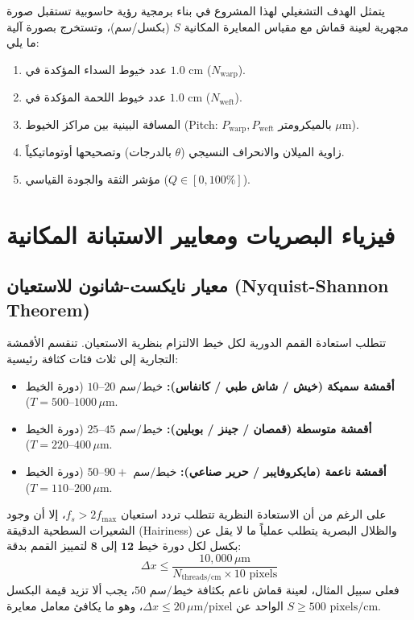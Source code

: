 \documentclass[11pt,a4paper]{article}
\begin{document}
يتمثل الهدف التشغيلي لهذا المشروع في بناء برمجية رؤية حاسوبية تستقبل صورة مجهرية لعينة قماش مع مقياس المعايرة المكانية $S$ (بكسل/سم)، وتستخرج بصورة آلية ما يلي:
\begin{enumerate}
    \item عدد خيوط السداء المؤكدة في $1.0\text{ cm}$ ($N_{\text{warp}}$).
    \item عدد خيوط اللحمة المؤكدة في $1.0\text{ cm}$ ($N_{\text{weft}}$).
    \item المسافة البينية بين مراكز الخيوط (Pitch: $P_{\text{warp}}, P_{\text{weft}}$ بالميكرومتر $\mu\text{m}$).
    \item زاوية الميلان والانحراف النسيجي ($\theta$ بالدرجات) وتصحيحها أوتوماتيكياً.
    \item مؤشر الثقة والجودة القياسي ($Q \in [0, 100\%]$).
\end{enumerate}

\section{فيزياء البصريات ومعايير الاستبانة المكانية}

\subsection{معيار نايكست-شانون للاستعيان (Nyquist-Shannon Theorem)}
تتطلب استعادة القمم الدورية لكل خيط الالتزام بنظرية الاستعيان. تنقسم الأقمشة التجارية إلى ثلاث فئات كثافة رئيسية:
\begin{itemize}
    \item \textbf{أقمشة سميكة (خيش / شاش طبي / كانفاس):} $10\text{--}20\text{ خيط/سم}$ (دورة الخيط $T = 500\text{--}1000\,\mu\text{m}$).
    \item \textbf{أقمشة متوسطة (قمصان / جينز / بوبلين):} $25\text{--}45\text{ خيط/سم}$ (دورة الخيط $T = 220\text{--}400\,\mu\text{m}$).
    \item \textbf{أقمشة ناعمة (مايكروفايبر / حرير صناعي):} $50\text{--}90+\text{ خيط/سم}$ (دورة الخيط $T = 110\text{--}200\,\mu\text{m}$).
\end{itemize}

على الرغم من أن الاستعادة النظرية تتطلب تردد استعيان $f_s > 2 f_{\max}$، إلا أن وجود الشعيرات السطحية الدقيقة (Hairiness) والظلال البصرية يتطلب عملياً ما لا يقل عن $\mathbf{8\text{ إلى }12\text{ بكسل لكل دورة خيط}}$ لتمييز القمم بدقة:
\begin{equation}
    \Delta x \le \frac{10,000\,\mu\text{m}}{N_{\text{threads/cm}} \times 10\text{ pixels}}
\end{equation}
فعلى سبيل المثال، لعينة قماش ناعم بكثافة $50\text{ خيط/سم}$، يجب ألا تزيد قيمة البكسل الواحد عن $\Delta x \le 20\,\mu\text{m/pixel}$، وهو ما يكافئ معامل معايرة $S \ge 500\text{ pixels/cm}$.
\end{document}
